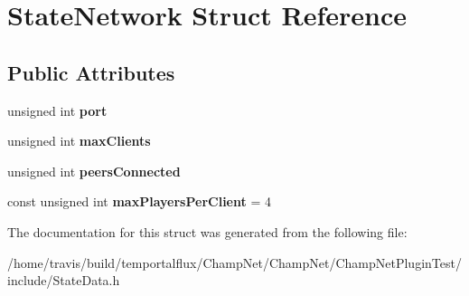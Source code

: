 \hypertarget{struct_state_network}{\section{State\-Network Struct Reference}
\label{struct_state_network}
}
\subsection*{Public Attributes}
\begin{DoxyCompactItemize}
\item 
\hypertarget{struct_state_network_a369a4768473db59ccbd4ba509a61595c}{unsigned int {\bfseries port}}\label{struct_state_network_a369a4768473db59ccbd4ba509a61595c}

\item 
\hypertarget{struct_state_network_a441e11a6962b2ef0f9456c937a1abbb6}{unsigned int {\bfseries max\-Clients}}\label{struct_state_network_a441e11a6962b2ef0f9456c937a1abbb6}

\item 
\hypertarget{struct_state_network_acad16df2ea00513fd70701fbfa90e329}{unsigned int {\bfseries peers\-Connected}}\label{struct_state_network_acad16df2ea00513fd70701fbfa90e329}

\item 
\hypertarget{struct_state_network_a49f4dd1dc1c43b2962da4dff48101003}{const unsigned int {\bfseries max\-Players\-Per\-Client} = 4}\label{struct_state_network_a49f4dd1dc1c43b2962da4dff48101003}

\end{DoxyCompactItemize}


The documentation for this struct was generated from the following file\-:\begin{DoxyCompactItemize}
\item 
/home/travis/build/temportalflux/\-Champ\-Net/\-Champ\-Net/\-Champ\-Net\-Plugin\-Test/include/State\-Data.\-h\end{DoxyCompactItemize}
